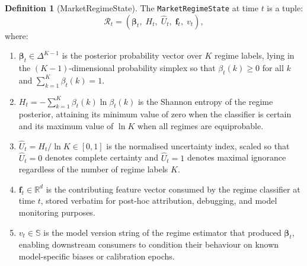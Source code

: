 \documentclass[12pt,openany]{book}
\numberwithin{equation}{chapter}
\theoremstyle{plain}
\theoremstyle{definition}
\newtheorem{definition}[theorem]{Definition}
\theoremstyle{remark}
\begin{document}
\begin{definition}[MarketRegimeState]
The \texttt{MarketRegimeState} at time $t$ is a tuple:
\begin{equation}
    \mathcal{R}_t = \left(
        \boldsymbol{\beta}_t,\; H_t,\; \hat{U}_t,\; \mathbf{f}_t,\; v_t
    \right),
\end{equation}
where:
\begin{enumerate}
    \item $\boldsymbol{\beta}_t \in \Delta^{K-1}$ is the posterior probability
          vector over $K$ regime labels, lying in the $(K-1)$-dimensional
          probability simplex so that $\beta_t(k) \geq 0$ for all $k$ and
          $\sum_{k=1}^{K} \beta_t(k) = 1$.
    \item $H_t = -\sum_{k=1}^K \beta_t(k) \ln \beta_t(k)$ is the Shannon
          entropy of the regime posterior, attaining its minimum value of zero
          when the classifier is certain and its maximum value of $\ln K$ when
          all regimes are equiprobable.
    \item $\hat{U}_t = H_t / \ln K \in [0, 1]$ is the normalised uncertainty
          index, scaled so that $\hat{U}_t = 0$ denotes complete certainty and
          $\hat{U}_t = 1$ denotes maximal ignorance regardless of the number of
          regime labels $K$.
    \item $\mathbf{f}_t \in \mathbb{R}^d$ is the contributing feature vector
          consumed by the regime classifier at time $t$, stored verbatim for
          post-hoc attribution, debugging, and model monitoring purposes.
    \item $v_t \in \mathbb{S}$ is the model version string of the regime
          estimator that produced $\boldsymbol{\beta}_t$, enabling downstream
          consumers to condition their behaviour on known model-specific
          biases or calibration epochs.
\end{enumerate}
\end{definition}
\end{document}

